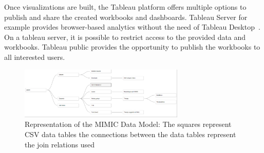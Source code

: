 \documentclass[aac,crcready]{iosart2x}
\begin{document}
Once visualizations are built, the Tableau platform offers multiple options to publish and share the created workbooks and dashboards. Tableau Server for example provides browser-based analytics without the need of Tableau Desktop~\cite{Tableau.20.03.2021}. On a tableau server, it is possible to restrict access to the provided data and workbooks. Tableau public provides the opportunity to publish the workbooks to all interested users.


\begin{figure}[ht]
\includegraphics[width=0.7\textwidth]{images/datamodel_1.png}
\caption{Representation of the MIMIC Data Model: The squares represent CSV data tables the connections between the data tables represent the join relations used}\label{f1}
\end{figure}
\end{document}
